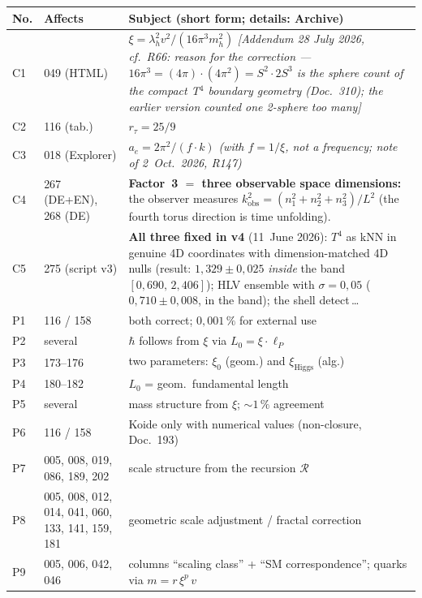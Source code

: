 \begingroup\small
\begin{longtable}{@{}p{0.9cm}p{3.1cm}p{10.2cm}@{}}
\toprule
\textbf{No.} & \textbf{Affects} & \textbf{Subject (short form; details: Archive)} \\
\midrule\endhead
\bottomrule\endfoot
C1 & 049 (HTML) & $\xi = \lambda_h^2 v^2/(16\pi^3 m_h^2)$ \emph{[Addendum 28 July 2026, cf.\ R66: reason for the correction --- $16\pi^3 = (4\pi)\cdot(4\pi^2) = S^2\cdot 2S^3$ is the sphere count of the compact T$^4$ boundary geometry (Doc.~310); the earlier version counted one 2-sphere too many]} \\
C2 & 116 (tab.) & $r_\tau = 25/9$ \\
C3 & 018 (Explorer) & $a_e = 2\pi^2/(f \cdot k)$ \emph{(with $f = 1/\xi$, not a frequency; note of 2~Oct.~2026, R147)} \\
C4 & 267 (DE+EN), 268 (DE) & \textbf{Factor~3 $=$ three observable space dimensions:} the observer measures $k_\mathrm{obs}^2=(n_1^2+n_2^2+n_3^2)/L^2$ (the fourth torus direction is time unfolding). \\
C5 & 275 (script v3) & \textbf{All three fixed in v4} (11~June 2026): $T^4$ as kNN in genuine 4D coordinates with dimension-matched 4D nulls (result: $1{,}329\pm0{,}025$ \emph{inside} the band $[0{,}690,\,2{,}406]$); HLV ensemble with $\sigma=0{,}05$ ($0{,}710\pm0{,}008$, in the band); the shell detect\,\ldots \\
P1 & 116 / 158 & both correct; $0{,}001\,\%$ for external use \\
P2 & several & $\hbar$ follows from $\xi$ via $L_0 = \xi\cdot\ell_P$ \\
P3 & 173--176 & two parameters: $\xi_0$ (geom.) and $\xi_{\text{Higgs}}$ (alg.) \\
P4 & 180--182 & $L_0$ = geom.\ fundamental length \\
P5 & several & mass structure from $\xi$; $\sim 1\,\%$ agreement \\
P6 & 116 / 158 & Koide only with numerical values (non-closure, Doc.~193) \\
P7 & 005, 008, 019, 086, 189, 202 & scale structure from the recursion $\mathcal{R}$ \\
P8 & 005, 008, 012, 014, 041, 060, 133, 141, 159, 181 & geometric scale adjustment / fractal correction \\
P9 & 005, 006, 042, 046 & columns \enquote{scaling class} + \enquote{SM correspondence}; \newline quarks via $m = r\,\xi^p\,v$ \\

\end{longtable}
